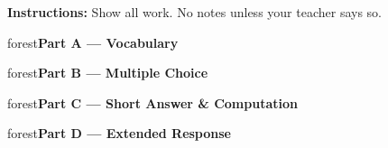 \documentclass[10pt]{article}
\newcommand{\parthead}[1]{%
  \vspace{6pt}\noindent
  \begin{headlinebox}{forest}\color{white}\bfseries #1\end{headlinebox}%
  \vspace{4pt}}
\begin{document}
\namedateperiod

\vspace{0.06in}
\noindent\textbf{Instructions:} Show all work. No notes unless your teacher says so.

\parthead{Part A --- Vocabulary}

\parthead{Part B --- Multiple Choice}

\parthead{Part C --- Short Answer \& Computation}

\parthead{Part D --- Extended Response}
\end{document}
